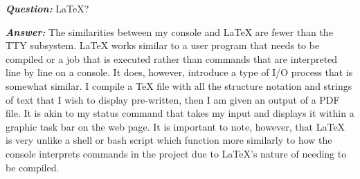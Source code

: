 \documentclass[letterpaper, 10pt,DIV=13]{scrartcl}
\numberwithin{equation}{section} %
\numberwithin{figure}{section} %
\numberwithin{table}{section} %
\begin{document}
\textbf{\emph{Question:}} LaTeX?


\textbf{\emph{Answer:}}
The similarities between my console and LaTeX are fewer than the TTY subsystem. LaTeX works similar to a user program that needs to be compiled or a job that is executed rather than commands that are interpreted line by line on a console. It does, however, introduce a type of I/O process that is somewhat similar. I compile a TeX file with all the structure notation and strings of text that I wish to display pre-written, then I am given an output of a PDF file. It is akin to my status command that takes my input and displays it within a graphic task bar on the web page. It is important to note, however, that LaTeX is very unlike a shell or bash script which function more similarly to how the console interprets commands in the project due to LaTeX's nature of needing to be compiled.

\end{document}
